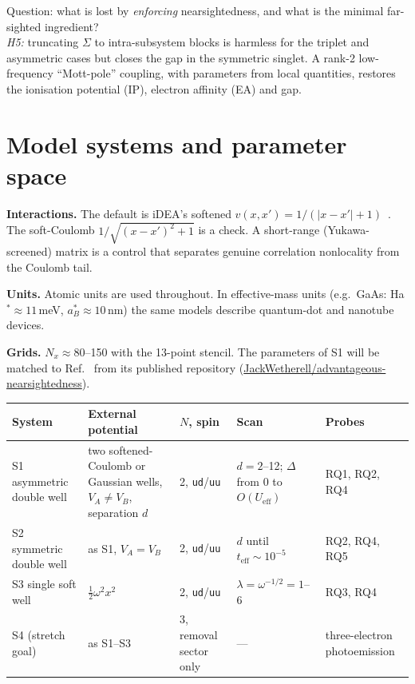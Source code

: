 \documentclass[11pt,a4paper]{article}
\newcommand{\iDEA}{iDEA}
\newcommand{\teff}{t_\mathrm{eff}}
\newcommand{\Ueff}{U_\mathrm{eff}}
\newcommand{\code}[1]{\texttt{#1}}
\begin{document}
\begin{description}[style=nextline,leftmargin=1em,labelindent=0pt,itemsep=6pt]
\item[RQ5 (consequences).] Question: what is lost by \emph{enforcing} nearsightedness, and what is the minimal far-sighted ingredient?\\
\textit{H5:} truncating $\Sigma$ to intra-subsystem blocks is harmless for the triplet and asymmetric cases but closes the gap in the symmetric singlet. A rank-2 low-frequency ``Mott-pole'' coupling, with parameters from local quantities, restores the ionisation potential (IP), electron affinity (EA) and gap.
\end{description}

\section{Model systems and parameter space}
\textbf{Interactions.} The default is \iDEA's softened $v(x,x')=1/(|x-x'|+1)$~\cite{wetherell2019}. The soft-Coulomb $1/\sqrt{(x-x')^2+1}$ is a check. A short-range (Yukawa-screened) matrix is a control that separates genuine correlation nonlocality from the Coulomb tail.

\textbf{Units.} Atomic units are used throughout. In effective-mass units (e.g.\ GaAs: Ha$^*\approx11$\,meV, $a_B^*\approx10$\,nm) the same models describe quantum-dot and nanotube devices.

\textbf{Grids.} $N_x\approx80$--150 with the 13-point stencil. The parameters of S1 will be matched to Ref.~\cite{wetherell2019} from its published repository (\href{https://github.com/JackWetherell/advantageous-nearsightedness}{JackWetherell/advantageous-nearsightedness}).

\begin{table}[h]
\centering\small
\begin{tabularx}{\textwidth}{@{}lYlYY@{}}
\toprule
System & External potential & $N$, spin & Scan & Probes\\
\midrule
S1 asymmetric double well & two softened-Coulomb or Gaussian wells, $V_A\neq V_B$, separation $d$ & 2, \code{ud}/\code{uu} & $d=2$--12; $\Delta$ from 0 to $O(\Ueff)$ & RQ1, RQ2, RQ4\\
S2 symmetric double well & as S1, $V_A=V_B$ & 2, \code{ud}/\code{uu} & $d$ until $\teff\sim10^{-5}$ & RQ2, RQ4, RQ5\\
S3 single soft well & $\tfrac12\omega^2x^2$ & 2, \code{ud}/\code{uu} & $\lambda=\omega^{-1/2}=1$--6 & RQ3, RQ4\\
S4 (stretch goal) & as S1--S3 & 3, removal sector only & --- & three-electron photoemission\\
\bottomrule
\end{tabularx}
\end{table}
\end{document}
